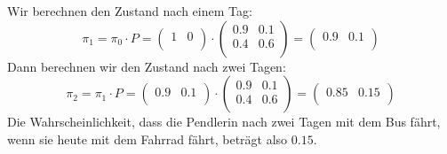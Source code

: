 \begin{myexercise}[Pendlerverhalten]
\begin{myanswer}
        Wir berechnen den Zustand nach einem Tag:
        \[
            \pi_1 = \pi_0 \cdot P =
            \begin{pmatrix}
                1 & 0 \\
            \end{pmatrix}
            \cdot
            \begin{pmatrix}
                0.9 & 0.1 \\
                0.4 & 0.6 \\
            \end{pmatrix}
            =
            \begin{pmatrix}
                0.9 & 0.1 \\
            \end{pmatrix}
        \]
        Dann berechnen wir den Zustand nach zwei Tagen:
        \[
            \pi_2 = \pi_1 \cdot P =
            \begin{pmatrix}
                0.9 & 0.1 \\
            \end{pmatrix}
            \cdot
            \begin{pmatrix}
                0.9 & 0.1 \\
                0.4 & 0.6 \\
            \end{pmatrix}
            =
            \begin{pmatrix}
                0.85 & 0.15 \\
            \end{pmatrix}
        \]
        Die Wahrscheinlichkeit, dass die Pendlerin nach zwei Tagen mit dem Bus fährt, wenn sie heute mit dem Fahrrad fährt, beträgt also $0.15$.
    \end{myanswer}
\end{myexercise}

